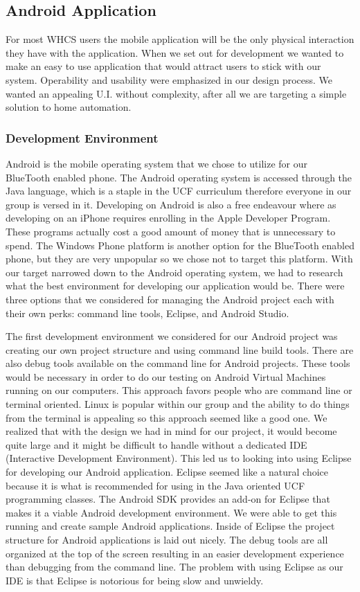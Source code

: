 \subsection{Android Application} For most WHCS users the mobile application
will be the only physical interaction they have with the application. When we
set out for development we wanted to make an easy to use application that would
attract users to stick with our system.  Operability and usability were
emphasized in our design process. We wanted an appealing U.I. without
complexity, after all we are targeting a simple solution to home automation.

\subsubsection{Development Environment} Android is the mobile operating system
that we chose to utilize for our BlueTooth enabled phone. The Android operating
system is accessed through the Java language, which is a staple in the UCF
curriculum therefore everyone in our group is versed in it. Developing on
Android is also a free endeavour where as developing on an iPhone requires
enrolling in the Apple Developer Program. These programs actually cost a good
amount of money that is unnecessary to spend. The Windows Phone platform is
another option for the BlueTooth enabled phone, but they are very unpopular so
we chose not to target this platform. With our target narrowed down to the
Android operating system, we had to research what the best environment for
developing our application would be. There were three options that we
considered for managing the Android project each with their own perks: command
line tools, Eclipse, and Android Studio.

The first development environment we considered for our Android project was
creating our own project structure and using command line build tools. There
are also debug tools available on the command line for Android projects. These
tools would be necessary in order to do our testing on Android Virtual Machines
running on our computers. This approach favors people who are command line or
terminal oriented. Linux is popular within our group and the ability to do
things from the terminal is appealing so this approach seemed like a good one.
We realized that with the design we had in mind for our project, it would
become quite large and it might be difficult to handle without a dedicated IDE
(Interactive Development Environment). This led us to looking into using
Eclipse for developing our Android application. Eclipse seemed like a natural
choice because it is what is recommended for using in the Java oriented UCF
programming classes.  The Android SDK provides an add{}-on for Eclipse that
makes it a viable Android development environment. We were able to get this
running and create sample Android applications. Inside of Eclipse the project
structure for Android applications is laid out nicely. The debug tools are all
organized at the top of the screen resulting in an easier development
experience than debugging from the command line. The problem with using Eclipse
as our IDE is that Eclipse is notorious for being slow and unwieldy.

